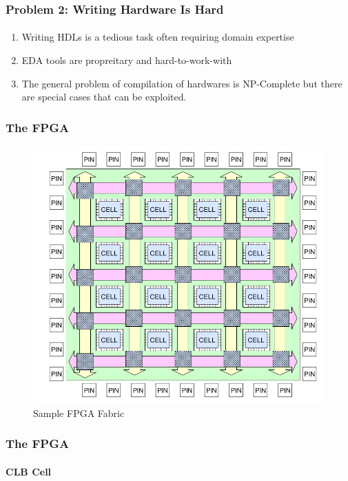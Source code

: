 \documentclass{beamer}
\begin{document}
{ 
\begin{frame}[fragile]
  \frametitle{Problem 2: Writing Hardware Is Hard}
  \framesubtitle{}
  \begin{enumerate}
    \item Writing HDLs is a tedious task often requiring domain expertise
    \item EDA tools are propreitary and hard-to-work-with
    \item The general problem of compilation of hardwares is NP-Complete but
      there are special cases that can be exploited.
  \end{enumerate}
\end{frame}


\begin{frame}[fragile]
  \frametitle{The FPGA}
  \begin{figure}
    \centering
    \includegraphics[width=0.5\linewidth]{images/fpga_fabric.png}
    \caption{Sample FPGA Fabric\cite{brown92}}
    \label{exa-fabric}
  \end{figure}
\end{frame}

\begin{frame}[fragile]
   \frametitle{The FPGA}
   \framesubtitle{CLB Cell}


\end{frame}}
\end{document}
